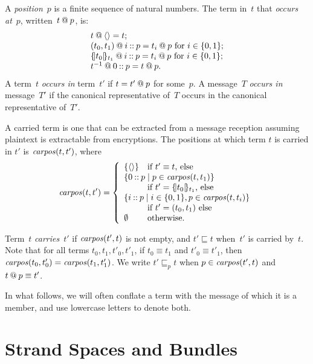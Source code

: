 \documentclass[12pt]{report}
\theoremstyle{definition}
\newcommand{\carpos}{\fn{carpos}}
\begin{document}
A \emph{position}~$p$ is a finite sequence of natural
numbers.  The term in~$t$ that \emph{occurs at}~$p$, written~$t\mathbin{@}
p$, is:
$$\begin{array}{l}
t\mathbin{@}\langle\rangle=t;\\
(t_0,t_1)\mathbin{@} i\mathbin{::} p=t_i\mathbin{@} p\mbox{ for $i\in\{0,1\}$};\\
\{\!|t_0|\!\}_{t_1}\mathbin{@} i\mathbin{::} p=t_i\mathbin{@} p\mbox{ for
  $i\in\{0,1\}$};\\
t^{-1}\mathbin{@} 0\mathbin{::} p=t\mathbin{@} p.
\end{array}$$
A term~$t$ \emph{occurs in} term~$t'$ if $t=t'\mathbin{@}
p$ for some~$p$.  A message~$T$ \emph{occurs in} message~$T'$ if the
canonical representative of~$T$ occurs in the canonical representative
of~$T'$.

A carried term is one that can be extracted from a message reception
assuming plaintext is extractable from encryptions.  The positions at
which term $t$ is carried in $t'$ is $\carpos(t,t')$\index{carpos@\carpos}\label{def:carried positions},
where
$$\carpos(t,t')=\left\{
\begin{array}{ll}
\{\seq{}\}&\mbox{if $t'\equiv t$, else}\\
\multicolumn{2}{l}{\{0\cons p \mid
p\in\carpos(t,t_1)\}}\\
& \mbox{if $t'=\enc{t_0}{t_1}$, else}\\
\multicolumn{2}{l}{\{i\cons p \mid
i\in\{0,1\}, p\in\carpos(t,t_i)\}} \\
& \mbox{if $t'=(t_0,t_1)$ else}\\
\emptyset&\mbox{otherwise.}
\end{array}\right.$$

Term~$t$ \emph{carries}~$t'$ if $\carpos(t',t)$ is not
empty, and $t'\sqsubseteq t$ when~$t'$ is carried by~$t$.  Note that
for all terms $t_0,t_1,t'_0,t'_1$, if $t_0\equiv t_1$ and $t'_0\equiv
t'_1$, then $\carpos(t_0,t'_0)= \carpos(t_1,t'_1)$.  We write $t'
\sqsubseteq_p t$ when $p \in \carpos(t',t)$ and $t \mathbin{@} p \equiv
t'$.

In what follows, we will often conflate a term with the message of
which it is a member, and use lowercase letters to denote both.

\chapter{Strand Spaces and Bundles}\label{chp:strand spaces and bundles}
\end{document}
